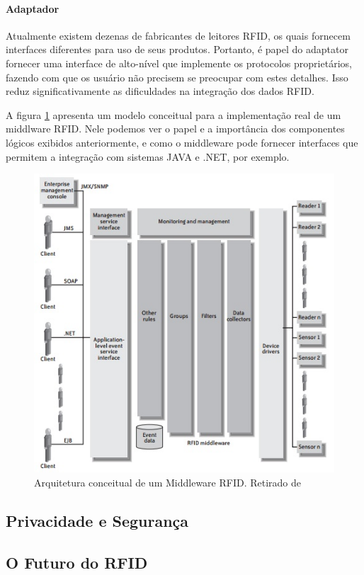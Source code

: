 	\paragraph{Adaptador} Atualmente existem dezenas de fabricantes de leitores RFID, os quais fornecem interfaces diferentes para uso de seus produtos. Portanto, é papel do adaptator fornecer uma interface de alto-nível que implemente os protocolos proprietários, fazendo com que os usuário não precisem se preocupar com estes detalhes. Isso reduz significativamente as dificuldades na integração dos dados RFID.
	
	A figura \ref{fig:midarc} apresenta um modelo conceitual para a implementação real de um middlware RFID. Nele podemos ver o papel e a importância dos componentes lógicos exibidos anteriormente, e como o middleware pode fornecer interfaces que permitem a integração com sistemas JAVA e .NET, por exemplo.
	
		\begin{figure}[h!]
			\centering
			\includegraphics[width=0.5\linewidth]{midarc}
			\caption{Arquitetura conceitual de um Middleware RFID. Retirado de \cite{rfidbook}}
			\label{fig:midarc}
		\end{figure}
	
	\subsection{Privacidade e Segurança}
	
	\subsection{O Futuro do RFID}
	
%	 
%	 
	 


% 